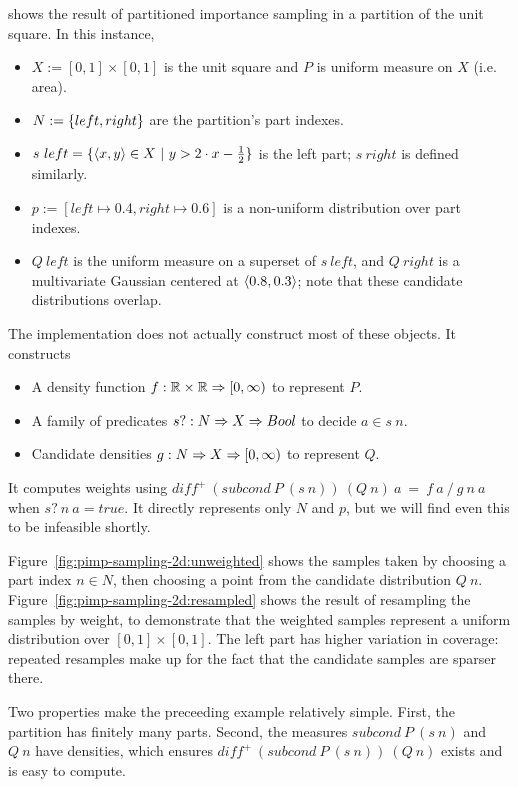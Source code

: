 \begin{example}
 shows the result of partitioned importance sampling in a partition of the unit square.
In this instance,
\begin{itemize}
	\item $X := [0,1] \times [0,1]$ is the unit square and $P$ is uniform measure on $X$ (i.e. area).
	\item $N := \{{left,right}\}$ are the partition's part indexes.
	\item $s~left = \lbrace {\langle{x,y}\rangle \in X} \ \lvert\ {y > 2 \cdot x - \frac{1}{2}} \rbrace$ is the left part; $s~right$ is defined similarly.
	\item $p := [left \mapsto 0.4, right \mapsto 0.6]$ is a non-uniform distribution over part indexes.
	\item $Q~left$ is the uniform measure on a superset of $s~left$, and $Q~right$ is a multivariate Gaussian centered at $\langle{0.8,0.3}\rangle$; note that these candidate distributions overlap.
\end{itemize}
The implementation does not actually construct most of these objects. It constructs
\begin{itemize}
	\item A density function $f : \mathbb{R} \times \mathbb{R} \Rightarrow [0,\infty)$ to represent $P$.
	\item A family of predicates $s? : N \Rightarrow X \Rightarrow Bool$ to decide $a \in s~n$.
	\item Candidate densities $g : N \Rightarrow X \Rightarrow [0,\infty)$ to represent $Q$.
\end{itemize}
It computes weights using $diff^+~(subcond~P~(s~n))~(Q~n)~a\ =\ f~a~{/}~g~n~a$ when $s?~n~a = true$.
It directly represents only $N$ and $p$, but we will find even this to be infeasible shortly.

Figure~\ref{fig:pimp-sampling-2d:unweighted} shows the samples taken by choosing a part index $n \in N$, then choosing a point from the candidate distribution $Q~n$.
Figure~\ref{fig:pimp-sampling-2d:resampled} shows the result of resampling the samples by weight, to demonstrate that the weighted samples represent a uniform distribution over $[0,1] \times [0,1]$.
The left part has higher variation in coverage: repeated resamples make up for the fact that the candidate samples are sparser there.
\exampleqed
\end{example}

Two properties make the preceeding example relatively simple.
First, the partition has finitely many parts.
Second, the measures $subcond~P~(s~n)$ and $Q~n$ have densities, which ensures $diff^+~(subcond~P~(s~n))~(Q~n)$ exists and is easy to compute.

